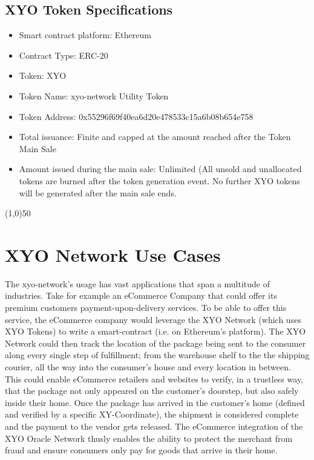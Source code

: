 \documentclass{article}
\begin{document}
\subsection {XYO Token Specifications}
\begin{itemize}
\item Smart contract platform: Ethereum
\item Contract Type: ERC-20
\item Token: XYO
\item Token Name: \Gls{xyo-network} Utility Token
\item Token Address: 0x55296f69f40ea6d20e478533c15a6b08b654e758
\item Total issuance: Finite and capped at the amount reached after the Token Main Sale
\item Amount issued during the main sale: Unlimited (All unsold and unallocated tokens are burned after the token generation event. No further XYO tokens will be generated after the main sale ends.
\end{itemize}

\begin{center}
\line(1,0){50}
\end{center}

\section{XYO Network Use Cases}

The \Gls{xyo-network}'s usage  has vast applications that span a multitude of industries. Take for example an eCommerce Company that could offer its premium customers payment-upon-delivery services. To be able to offer this service, the eCommerce company would leverage the XYO Network (which uses XYO Tokens) to write a \gls{smart-contract} (i.e. on Ethereum's platform). The XYO Network could then track the location of the package being sent to the consumer along every single step of fulfillment; from the warehouse shelf to the the shipping courier, all the way into the consumer's house and every location in between. This could enable eCommerce retailers and websites to verify, in a trustless way, that the package not only appeared on the customer's doorstep, but also safely inside their home. Once the package has arrived in the customer's home (defined and verified by a specific XY-Coordinate), the shipment is considered complete and the payment to the vendor gets released. The eCommerce integration of the XYO Oracle Network thusly enables the ability to protect the merchant from fraud and ensure consumers only pay for goods that arrive in their home.
\end{document}
